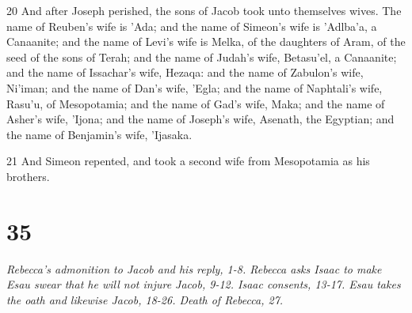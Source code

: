 \par 20 And after Joseph perished, the sons of Jacob took unto themselves wives. The name of Reuben's wife is 'Ada; and the name of Simeon's wife is 'Adlba'a, a Canaanite; and the name of Levi's wife is Melka, of the daughters of Aram, of the seed of the sons of Terah; and the name of Judah's wife, Betasu'el, a Canaanite; and the name of Issachar's wife, Hezaqa: and the name of Zabulon's wife, Ni'iman; and the name of Dan's wife, 'Egla; and the name of Naphtali's wife, Rasu'u, of Mesopotamia; and the name of Gad's wife, Maka; and the name of Asher's wife, 'Ijona; and the name of Joseph's wife, Asenath, the Egyptian; and the name of Benjamin's wife, 'Ijasaka.
\par 21 And Simeon repented, and took a second wife from Mesopotamia as his brothers.

\chapter{35}

\par \textit{Rebecca's admonition to Jacob and his reply, 1-8. Rebecca asks Isaac to make Esau swear that he will not injure Jacob, 9-12. Isaac consents, 13-17. Esau takes the oath and likewise Jacob, 18-26. Death of Rebecca, 27.}

